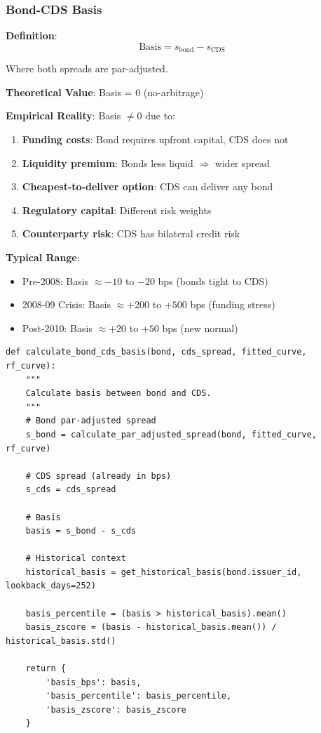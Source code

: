 \documentclass[11pt,a4paper]{article}
\begin{document}
\subsubsection{Bond-CDS Basis}

\begin{keybox}
\textbf{Definition}:
\begin{equation}
\text{Basis} = s_{\text{bond}} - s_{\text{CDS}}
\end{equation}

Where both spreads are par-adjusted.

\textbf{Theoretical Value}: Basis = 0 (no-arbitrage)

\textbf{Empirical Reality}: Basis $\ne 0$ due to:
\begin{enumerate}
    \item \textbf{Funding costs}: Bond requires upfront capital, CDS does not
    \item \textbf{Liquidity premium}: Bonds less liquid $\Rightarrow$ wider spread
    \item \textbf{Cheapest-to-deliver option}: CDS can deliver any bond
    \item \textbf{Regulatory capital}: Different risk weights
    \item \textbf{Counterparty risk}: CDS has bilateral credit risk
\end{enumerate}

\textbf{Typical Range}:
\begin{itemize}
    \item Pre-2008: Basis $\approx -10$ to $-20$ bps (bonds tight to CDS)
    \item 2008-09 Crisis: Basis $\approx +200$ to $+500$ bps (funding stress)
    \item Post-2010: Basis $\approx +20$ to $+50$ bps (new normal)
\end{itemize}
\end{keybox}

\begin{implbox}
\begin{lstlisting}
def calculate_bond_cds_basis(bond, cds_spread, fitted_curve, rf_curve):
    """
    Calculate basis between bond and CDS.
    """
    # Bond par-adjusted spread
    s_bond = calculate_par_adjusted_spread(bond, fitted_curve, rf_curve)
    
    # CDS spread (already in bps)
    s_cds = cds_spread
    
    # Basis
    basis = s_bond - s_cds
    
    # Historical context
    historical_basis = get_historical_basis(bond.issuer_id, lookback_days=252)
    
    basis_percentile = (basis > historical_basis).mean()
    basis_zscore = (basis - historical_basis.mean()) / historical_basis.std()
    
    return {
        'basis_bps': basis,
        'basis_percentile': basis_percentile,
        'basis_zscore': basis_zscore
    }
\end{lstlisting}
\end{implbox}
\end{document}
